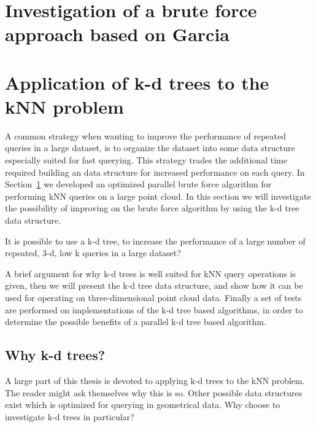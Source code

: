 \section{Investigation of a brute force approach based on Garcia} %
\label{sub:investigation_of_a_brute_force_approach_based_on_garcia}



\section{Application of k-d trees to the kNN problem} %
\label{sub:application_of_kd_trees_to_the_knn_problem}

A common strategy when wanting to improve the performance of repeated queries in a large dataset, is to organize the dataset into some data structure especially suited for fast querying. This strategy trades the additional time required building an data structure for increased performance on each query. In Section~\ref{sub:investigation_of_a_brute_force_approach_based_on_garcia} we developed an optimized parallel brute force algorithm for performing kNN queries on a large point cloud. In this section we will investigate the possibility of improving on the brute force algorithm by using the k-d tree data structure.

\begin{myrq}
\label{rq:serial-kd-tree}
    It is possible to use a k-d tree, to increase the performance of a large number of repeated, 3-d, low k queries in a large dataset?
\end{myrq}

A brief argument for why k-d trees is well suited for kNN query operations is given, then we will present the k-d tree data structure, and show how it can be used for operating on three-dimensional point cloud data. Finally a set of tests are performed on implementations of the k-d tree based algorithms, in order to determine the possible benefits of a parallel k-d tree based algorithm.

\subsection{Why k-d trees?} %
\label{sub:why_k_d_trees_}
A large part of this thesis is devoted to applying k-d trees to the kNN problem. The reader might ask themselves why this is so. Other possible data structures exist which is optimized for querying in geometrical data. Why choose to investigate k-d trees in particular?

